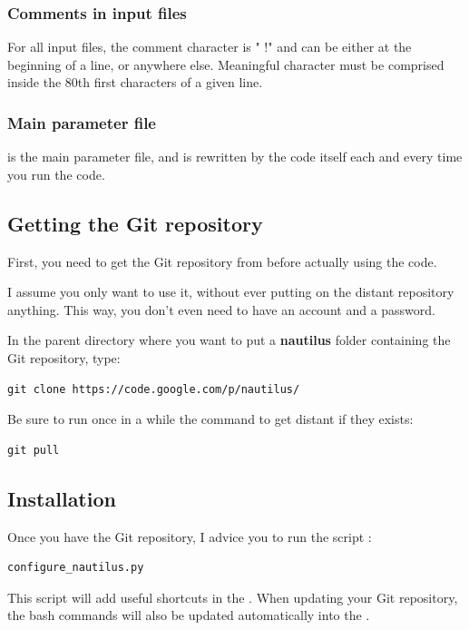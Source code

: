 \documentclass[english,a4paper,twoside]{article}
\begin{document}
\subsubsection{Comments in input files}\label{sec:files_generic_info}
For all input files, the comment character is " !" and can be either at the beginning of a line, or anywhere else. Meaningful character must be comprised inside the 80th first characters of a given line.

\subsubsection{Main parameter file}
 is the main parameter file, and is rewritten by the code itself each and every time you run the code. 

\subsection{Getting the Git repository}
First, you need to get the Git repository from  before actually using the code. 

I assume you only want to use it, without ever putting on the distant repository anything. This way, you don't even need to have an account and a password. 

In the parent directory where you want to put a \textbf{nautilus} folder containing the Git repository, type:
\begin{verbatim}
git clone https://code.google.com/p/nautilus/
\end{verbatim}

Be sure to run once in a while the command to get distant  if they exists:
\begin{verbatim}
git pull
\end{verbatim}

\subsection{Installation}\label{sec:installation}
Once you have the Git repository, I advice you to run the script  : 
\begin{verbatim}
configure_nautilus.py
\end{verbatim}

This script will add useful shortcuts in the . When updating your Git repository, the bash commands will also be updated automatically into the .
\end{document}
